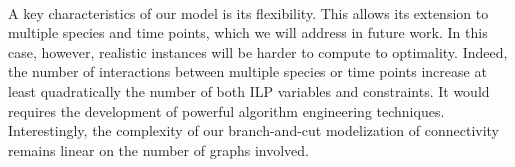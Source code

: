 \paragraph{}
A key characteristics of our model is its flexibility.
This allows its extension to multiple species and time points, which we will address in future work.
In this case, however, realistic instances will be harder to compute to optimality.
Indeed, the number of interactions between multiple species or time points increase at least quadratically the number of both ILP variables and constraints.
It would requires the development of powerful algorithm engineering techniques.
Interestingly, the complexity of our branch-and-cut modelization of connectivity remains linear on the number of graphs involved.

%
%

